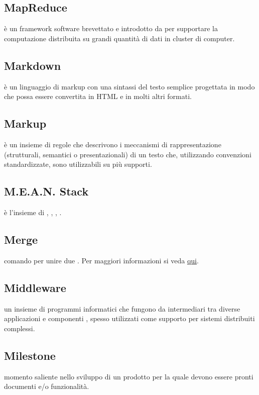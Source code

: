 \documentclass[12pt,a4paper]{article}
\begin{document}
\subsection{MapReduce} 
 è un framework software brevettato e introdotto da  per supportare la computazione distribuita su grandi quantità di dati in cluster di computer.
 
\subsection{Markdown} 
è un linguaggio di markup con una sintassi del testo semplice progettata in modo che possa essere convertita in HTML e in molti altri formati.

\subsection{Markup} 
 è un insieme di regole che descrivono i meccanismi di rappresentazione (strutturali, semantici o presentazionali) di un testo che, utilizzando convenzioni standardizzate, sono utilizzabili su più supporti.

\subsection{M.E.A.N. Stack}
è l'insieme di , , , .

\subsection{Merge} 
 comando  per unire due . Per maggiori informazioni si veda \href{https://git-scm.com/docs/}{qui}.

\subsection{Middleware} 
 un insieme di programmi informatici che fungono da intermediari tra diverse applicazioni e componenti ,  spesso utilizzati come supporto per sistemi distribuiti complessi.


\subsection{Milestone} 
 momento saliente nello sviluppo di un prodotto  per la quale devono essere pronti documenti e/o funzionalità.
\end{document}
